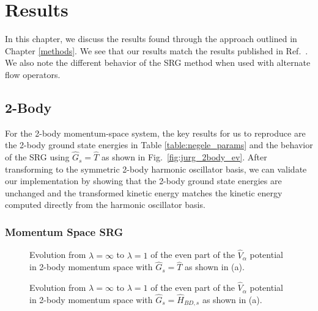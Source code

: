 \chapter{Results}

In this chapter, we discuss the results found through the approach outlined in Chapter \ref{methods}. We see that our results match the results published in Ref.~\cite{Jurgenson:2008jp}. We also note the different behavior of the SRG method when used with alternate flow operators.

\section{2-Body}

For the 2-body momentum-space system, the key results for us to reproduce are the 2-body ground state energies in Table \ref{table:negele_params} and the behavior of the SRG using $\hat{G}_s=\hat{T}$ as shown in Fig.~\ref{fig:jurg_2body_ev}. After transforming to the symmetric 2-body harmonic oscillator basis, we can validate our implementation by showing that the 2-body ground state energies are unchanged and the transformed kinetic energy matches the kinetic energy computed directly from the harmonic oscillator basis.

\subsection{Momentum Space SRG}

\begin{figure}[th!]
\begin{center}
\end{center}
\caption{Evolution from $\lambda=\infty$ to $\lambda=1$ of the even part of the $\hat{V}_\alpha$ potential in 2-body momentum space with $\hat{G}_s=\hat{T}$ as shown in (a).}
\label{fig:2body_T_full}
\end{figure}

\begin{figure}[th!]
\begin{center}
\end{center}
\caption{Evolution from $\lambda=\infty$ to $\lambda=1$ of the even part of the $\hat{V}_\alpha$ potential in 2-body momentum space with $\hat{G}_s=\hat{H}_{BD, s}$ as shown in (a).}
\label{fig:2body_BD_full}
\end{figure}

